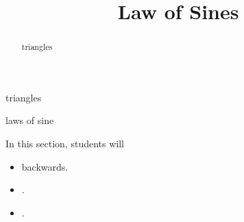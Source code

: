 \documentclass{ximera}
\title{Law of Sines}
\begin{document}
\begin{abstract}
triangles
\end{abstract}
\maketitle





triangles

laws of sine 










\begin{sectionOutcomes}
In this section, students will 

\begin{itemize}
\item backwards.
\item .
\item .
\end{itemize}
\end{sectionOutcomes}
\end{document}
